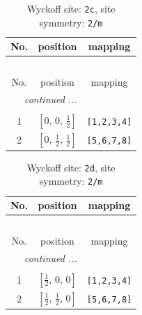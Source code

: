 \documentclass[fleqn,8pt]{jsarticle}
\begin{document}
\begin{longtable}{ccc}
\caption{Wyckoff site: {\tt 2c}, site symmetry: {\tt 2/m}}
 \\
 \hline \hline
No. & position & mapping \\ \hline \endfirsthead

\multicolumn{2}{l}{\tablename\ \thetable{}} \\
 \hline \hline
No. & position & mapping \\ \hline \endhead

 \hline \hline
\multicolumn{2}{r}{\footnotesize\it continued ...} \\ \endfoot

 \hline \hline
\multicolumn{2}{r}{} \\ \endlastfoot

1 & $\left[ 0,\, 0,\, \frac{1}{2} \right]$ & {\tt [1,2,3,4]} \\ \hline
2 & $\left[ 0,\, \frac{1}{2},\, \frac{1}{2} \right]$ & {\tt [5,6,7,8]} \\
\end{longtable}
\renewcommand{\arraystretch}{1.2}
\begin{longtable}{ccc}
\caption{Wyckoff site: {\tt 2d}, site symmetry: {\tt 2/m}}
 \\
 \hline \hline
No. & position & mapping \\ \hline \endfirsthead

\multicolumn{2}{l}{\tablename\ \thetable{}} \\
 \hline \hline
No. & position & mapping \\ \hline \endhead

 \hline \hline
\multicolumn{2}{r}{\footnotesize\it continued ...} \\ \endfoot

 \hline \hline
\multicolumn{2}{r}{} \\ \endlastfoot

1 & $\left[ \frac{1}{2},\, 0,\, 0 \right]$ & {\tt [1,2,3,4]} \\ \hline
2 & $\left[ \frac{1}{2},\, \frac{1}{2},\, 0 \right]$ & {\tt [5,6,7,8]} \\
\end{longtable}
\renewcommand{\arraystretch}{1.2}
\end{document}
